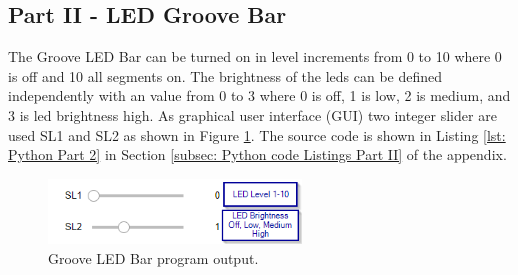 \subsection{Part II - LED Groove Bar}\label{subsec: Part II - LED Groove Bar}
The Groove LED Bar can be turned on in level increments from 0 to 10 where 0 is off and 10 all segments on. The brightness of the leds can be defined independently with an value from 0 to 3 where 0 is off, 1 is low, 2 is medium, and 3 is led brightness high. As graphical user interface (GUI) two integer slider are used SL1 and SL2 as shown in Figure \ref{fig: part2_output}. The source code is shown in Listing \ref{lst: Python Part 2} in Section \ref{subsec: Python code Listings Part II} of the appendix.

	\begin{figure}[H]
	\centering
	\includegraphics[width=0.6\textwidth]{01_images/p2_gui}
	\caption{Groove LED Bar program output.}
	\label{fig: part2_output}
	\end{figure}

